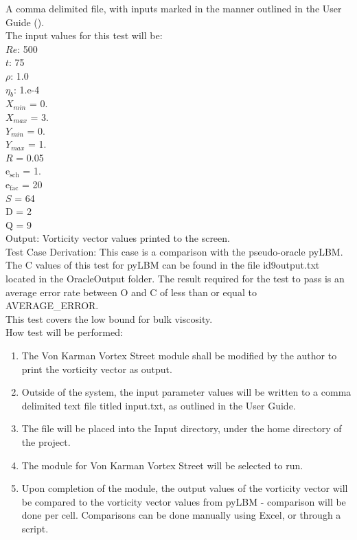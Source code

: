 \documentclass[12pt, titlepage]{article}
\begin{document}
\begin{enumerate}
A comma delimited file, with inputs marked in the manner outlined in the User Guide (\citet{LBM_UserGuide_PM}).\\The input values for this test will be:\\
$Re$: 500\\
$t$: 75\\
$\rho$: 1.0\\
$\eta_b$: 1.e-4\\
$X_{min}$ = 0.\\
$X_{max}$ = 3.\\
$Y_{min}$ = 0.\\
$Y_{max}$ = 1.\\
$R$ = 0.05\\
$\mathrm{e_{sch}}$ = 1.\\
$\mathrm{e_{fac}}$ = 20\\
$S$ = 64\\
$\mathrm{D}$ = 2\\
$\mathrm{Q}$ = 9\\

Output: Vorticity vector values printed to the screen.  \\

Test Case Derivation: This case is a comparison with the pseudo-oracle pyLBM. The C values of this test for pyLBM can be found in the file id9output.txt located in the OracleOutput folder. The result required for the test to pass is an average error rate between O and C of less than or equal to AVERAGE\_ERROR.\\
This test covers the low bound for bulk viscosity.\\

					
How test will be performed: 

\begin{enumerate}
\item The Von Karman Vortex Street module shall be modified by the author to print the vorticity vector as output.
\item Outside of the system, the input parameter values will be written to a comma delimited text file titled input.txt, as outlined in the User Guide.
\item The file will be placed into the Input directory, under the home directory of the project.
\item The module for Von Karman Vortex Street will be selected to run.
\item Upon completion of the module, the output values of the vorticity vector will be compared to the vorticity vector values from pyLBM - comparison will be done per cell. Comparisons can be done manually using Excel, or through a script.\\
\end{enumerate}


\end{enumerate}
\end{document}
